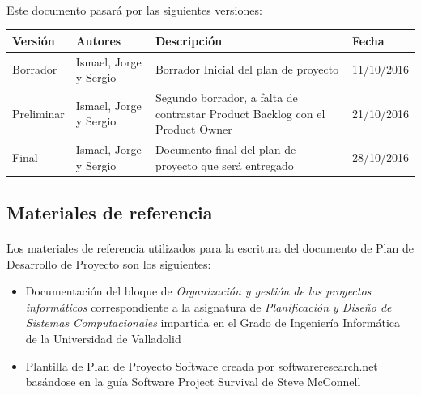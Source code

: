 \documentclass{article}
\begin{document}
          \paragraph{} 
          Este documento pasará por las siguientes versiones:
            \begin{center}
              \begin{tabular}{ | p{1.8cm} | p{3.5cm} | p{6cm} | p{2cm} |}
              \hline
              \rowcolor{Cornblue}
	        	\color{white} \textbf{Versión} &
    	    	\color{white} \textbf{Autores} & 
            	\color{white} \textbf{Descripción} &
            	\color{white} \textbf{Fecha}  \\ \hline
              Borrador & Ismael, Jorge y Sergio & Borrador Inicial del plan de proyecto & 11/10/2016 \\ \hline
              Preliminar & Ismael, Jorge y Sergio & Segundo borrador, a falta de contrastar Product Backlog con el Product Owner & 21/10/2016 \\ \hline
              Final & Ismael, Jorge y Sergio & Documento final del plan de proyecto que será entregado & 28/10/2016 \\ \hline
              \end{tabular}
          \end{center}

        
		\subsection{Materiales de referencia}

			\paragraph{}
            Los materiales de referencia utilizados para la escritura del documento de Plan de Desarrollo de Proyecto son los siguientes:
            
            \begin{itemize}
				\item Documentación del bloque de \emph{Organización y gestión de los proyectos informáticos} correspondiente a la asignatura de \emph{Planificación y Diseño de Sistemas Computacionales} impartida en el Grado de Ingeniería Informática de la Universidad de Valladolid

				\item Plantilla de Plan de Proyecto Software creada por \url{} \href{http://www.softwareresearch.net}{softwareresearch.net} basándose en la guía Software Project Survival de Steve McConnell

			\end{itemize}
           
\end{document}
